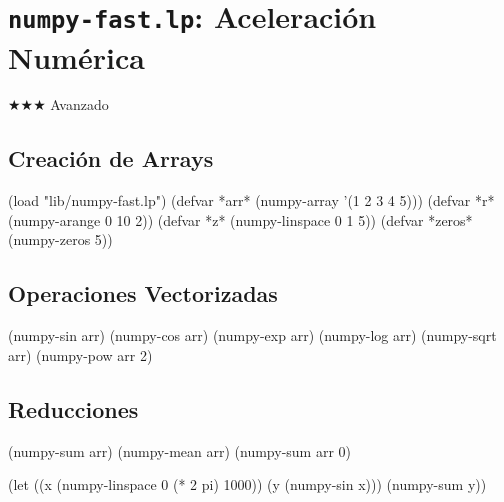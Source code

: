 \chapter{\texttt{numpy-fast.lp}: Aceleración Numérica}
\label{chap:numpy-fast}
{\huge$\bigstar$}{\huge$\bigstar$}{\huge$\bigstar$} Avanzado

\section{Creación de Arrays}
\begin{lispcode}
(load "lib/numpy-fast.lp")
(defvar *arr* (numpy-array '(1 2 3 4 5)))
(defvar *r* (numpy-arange 0 10 2))
(defvar *z* (numpy-linspace 0 1 5))
(defvar *zeros* (numpy-zeros 5))
\end{lispcode}

\section{Operaciones Vectorizadas}
\begin{lispcode}
(numpy-sin arr) (numpy-cos arr) (numpy-exp arr)
(numpy-log arr) (numpy-sqrt arr) (numpy-pow arr 2)
\end{lispcode}

\section{Reducciones}
\begin{lispcode}
(numpy-sum arr) (numpy-mean arr) (numpy-sum arr 0)
\end{lispcode}

\begin{examplebox}[title=Linspace para dominio de evaluación]
\begin{lispcode}
(let ((x (numpy-linspace 0 (* 2 pi) 1000))
      (y (numpy-sin x)))
  (numpy-sum y))
\end{lispcode}
\end{examplebox}

